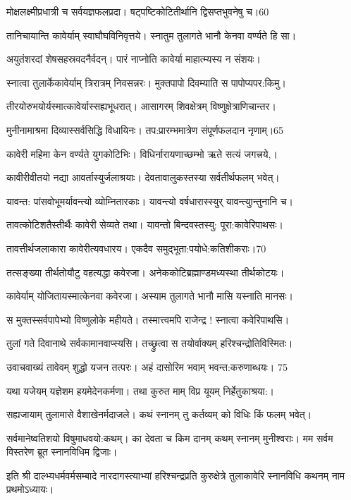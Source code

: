 मोक्षलक्ष्मीप्रधात्री च सर्वयज्ञफलप्रदा।
षट्पष्टिकोटितीर्थानि द्विसप्तभुवनेषु च।60

तानिचायान्ति कावेर्याम् स्वाघौघविनिवृत्तये।
स्नातुम तुलागते भानौ केनवा वर्ण्यते हि सा।

अयुतंशरदां शेषसहस्रवदनैर्वदन्।
पारं नाप्नोति कावेर्या माहात्म्यस्य न संशयः।

स्नात्वा तुलार्केकावेर्याम् त्रिरात्रम् निवसन्नरः।
मुक्तपापो दिवम्याति स पापोप्यपर:किमु।

तीरयोरुभयोर्यस्मात्कावेर्यास्सह्यभूधरात्।
आसागरम् शिवक्षेत्रम् विष्णुक्षेत्राणिचान्तर।

मुनीनामाश्रमा दिव्यास्सर्वसिद्धि विधायिनः।
तप:प्रारम्भमात्रेण संपूर्णफलदान नृणाम्।65

कावेरी महिमा केन वर्ण्यते युगकोटिभिः।
विधिर्नारायणाच्छम्भो ऋते सत्यं जगत्त्रये,।

कावीरीवीतयो नद्या आवर्तास्युर्जलाश्रयाः।
देवतावालुकस्तस्या सर्वतीर्थफलम् भवेत्।

यावन्त: पांसवोभूमर्यावन्त्यो व्योम्नितारकाः।
यावन्त्यो वर्षधारास्स्युर् यावन्त्युान्तुनानि च।

तावत्कोटिशतैस्तीर्थैः कावेरी सेव्यते तथा।
यावन्तो बिन्दवस्तस्यु: पूरा:कावेरिपाथसः।

तावत्तीर्थजलाकारा कावेरीत्यवधारय।
एकदैव समुद्भूता:पयोधे:कतिशीकराः।70

तत्सङ्ख्या तीर्थतोयौटु वहत्यद्धा कवेरजा।
अनेककोटिब्रह्माण्डमध्यस्था तीर्थकोटयः।

कावेर्याम् योजितायस्मात्केनवा कवेरजा।
अस्याम तुलागते भानौ मासि यस्नाति मानसः।

स मुक्तस्सर्वपापेभ्यो विष्णुलोके महीयते।
तस्मात्त्वमपि राजेन्द्र ! स्नात्वा कवेरिपाथसि।

तुलां गते दिवानाथे सर्वकामानवाप्स्यसि।
तच्छ्रुत्वा स तयोर्वाक्यम् हरिश्चन्द्रोतिविस्मितः।

उवाचवाख्यं तावेवम् शुद्धो यजन तत्परः।
अहं दासोरिम भवाम् भवन्त:करुणाब्धयः। 75

यथा यजेयम् यज्ञेशम हयमेदेनकर्मणा।
तथा कुरुत माम् विप्र यूयम् निर्हेतुकाश्रया:।

सह्यजायाम् तुलामासे वैशाखेनर्मदाजले।
कथं स्नानम् तु कर्तव्यम् को विधिः किं फलम् भवेत्।

सर्वमानेष्वतिशयो विषुमाधवयो:कथम्।
का देवता च किम दानम् कथम् स्नानम् मुनीश्वराः।
मम सर्वम विस्तरेण ब्रूत स्नानविधिम द्विजाः।

इति श्री दाल्भ्यधर्मवर्मसम्बादे नारदागस्त्याभ्यां हरिश्चन्द्रप्रति कुरुक्षेत्रे तुलाकावेरि स्नानविधि कथनम् नाम प्रथमोऽध्यायः।




